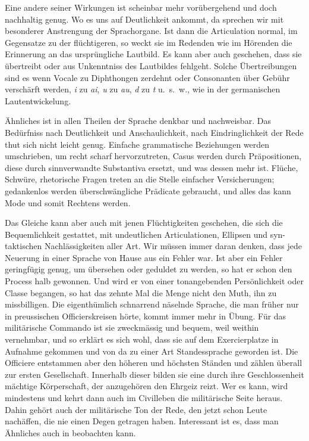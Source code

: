 {Eine andere seiner Wirkungen ist scheinbar mehr vorübergehend und doch nachhaltig genug. Wo es uns auf Deutlichkeit ankommt, da sprechen wir mit besonderer Anstrengung der Sprachorgane. Ist dann die Articulation normal, im Gegensatze zu der flüchtigeren, so weckt sie im Redenden wie im Hörenden die Erinnerung an das ursprüngliche Lautbild. Es kann aber auch geschehen, dass sie übertreibt oder aus Unkenntniss des  Lautbildes fehlgeht. Solche Übertreibungen sind es  wenn Vocale zu Diphthongen zerdehnt oder Consonanten über Gebühr verschärft werden, \textit{i} zu \textit{ai}, \textit{u} zu \textit{au}, \textit{d} zu \textit{t} u.~s.~w., wie in der germanischen Lautentwickelung.

Ähnliches ist in allen Theilen der Sprache denkbar und nachweisbar. Das Bedürfniss nach Deutlichkeit und Anschaulichkeit, nach Eindringlichkeit der Rede thut sich nicht leicht genug. Einfache grammatische Beziehungen werden umschrieben, um recht scharf hervorzutreten, Casus werden durch Präpositionen, diese durch sinnverwandte Substantiva ersetzt, und was dessen mehr ist. Flüche, Schwüre, rhetorische Fragen treten an die Stelle einfacher Versicherungen; gedankenlos werden überschwängliche Prädicate gebraucht, und alles das kann Mode und somit Rechtens werden.

\begin{sloppypar}Das Gleiche kann aber auch mit jenen Flüchtigkeiten geschehen, die sich die Bequemlichkeit gestattet, mit undeutlichen Articulationen, Ellipsen und syn- \label{sp.184} taktischen Nachlässigkeiten aller Art. Wir müssen \label{fp.194} immer daran denken, dass jede Neuerung in einer Sprache von Hause aus ein Fehler war. Ist aber ein Fehler geringfügig genug, um übersehen oder geduldet zu werden, so hat er schon den Process halb gewonnen. Und wird er von einer tonangebenden Persönlichkeit oder Classe begangen, so hat das zehnte Mal die Menge nicht den Muth, ihn zu missbilligen. Die eigenthümlich schnarrend näselnde Sprache, die man früher nur in preussischen Officierskreisen hörte, kommt immer mehr in Übung. Für das militärische Commando ist sie zweckmässig und bequem, weil weithin vernehmbar, und so erklärt es sich wohl, dass sie auf dem Exercierplatze in Aufnahme gekommen und von da zu einer Art Standessprache geworden ist. Die Officiere entstammen aber den höheren und höchsten Ständen und zählen überall zur ersten Gesellschaft. Innerhalb dieser bilden sie eine durch ihre Geschlossenheit mächtige Körperschaft, der anzugehören den Ehrgeiz reizt. Wer es kann, wird mindestens  und kehrt dann auch im Civilleben die militärische Seite heraus. Dahin gehört auch der militärische Ton der Rede, den jetzt schon Leute nachäffen, die nie einen Degen getragen haben. Interessant ist es, dass man Ähnliches auch in  beobachten kann.\end{sloppypar}

}
